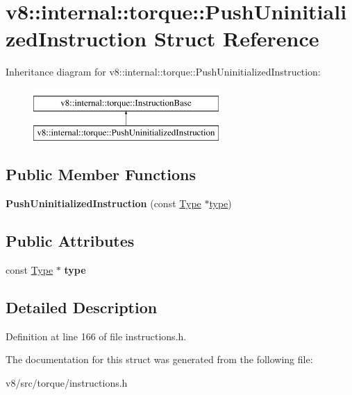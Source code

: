 \hypertarget{structv8_1_1internal_1_1torque_1_1PushUninitializedInstruction}{}\section{v8\+:\+:internal\+:\+:torque\+:\+:Push\+Uninitialized\+Instruction Struct Reference}
\label{structv8_1_1internal_1_1torque_1_1PushUninitializedInstruction}
Inheritance diagram for v8\+:\+:internal\+:\+:torque\+:\+:Push\+Uninitialized\+Instruction\+:\begin{figure}[H]
\begin{center}
\leavevmode
\includegraphics[height=2.000000cm]{structv8_1_1internal_1_1torque_1_1PushUninitializedInstruction}
\end{center}
\end{figure}
\subsection*{Public Member Functions}
\begin{DoxyCompactItemize}
\item 
\mbox{\label{structv8_1_1internal_1_1torque_1_1PushUninitializedInstruction_aadb72a2c58c8bdbd75bcfaead0eae580}} 
{\bfseries Push\+Uninitialized\+Instruction} (const \mbox{\hyperlink{classv8_1_1internal_1_1torque_1_1Type}{Type}} $\ast$\mbox{\hyperlink{classstd_1_1conditional_1_1type}{type}})
\end{DoxyCompactItemize}
\subsection*{Public Attributes}
\begin{DoxyCompactItemize}
\item 
\mbox{\label{structv8_1_1internal_1_1torque_1_1PushUninitializedInstruction_a9f278172163d8211591db989833d3b39}} 
const \mbox{\hyperlink{classv8_1_1internal_1_1torque_1_1Type}{Type}} $\ast$ {\bfseries type}
\end{DoxyCompactItemize}


\subsection{Detailed Description}


Definition at line 166 of file instructions.\+h.



The documentation for this struct was generated from the following file\+:\begin{DoxyCompactItemize}
\item 
v8/src/torque/instructions.\+h\end{DoxyCompactItemize}
